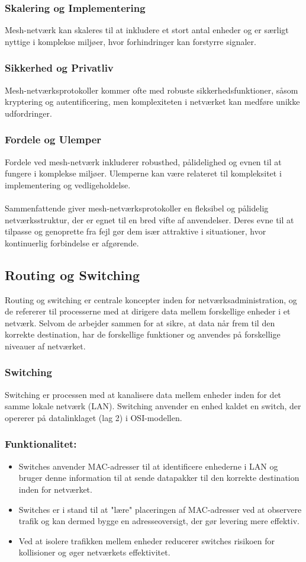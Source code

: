 \subsubsection{Skalering og Implementering}
Mesh-netværk kan skaleres til at inkludere et stort antal enheder og er særligt nyttige i komplekse miljøer, hvor forhindringer kan forstyrre signaler.
\subsubsection{Sikkerhed og Privatliv}
Mesh-netværksprotokoller kommer ofte med robuste sikkerhedsfunktioner, såsom kryptering og autentificering, men komplexiteten i netværket kan medføre unikke udfordringer.
\subsubsection{Fordele og Ulemper}
Fordele ved mesh-netværk inkluderer robusthed, pålidelighed og evnen til at fungere i komplekse miljøer. Ulemperne kan være relateret til kompleksitet i implementering og vedligeholdelse.
\\
\\
Sammenfattende giver mesh-netværksprotokoller en fleksibel og pålidelig \\
netværksstruktur, der er egnet til en bred vifte af anvendelser. Deres evne til at tilpasse og genoprette fra fejl gør dem især attraktive i situationer, hvor kontinuerlig forbindelse er afgørende.
\subsection{Routing og Switching}
Routing og switching er centrale koncepter inden for netværksadministration, og de refererer til processerne med at dirigere data mellem forskellige enheder i et netværk. Selvom de arbejder sammen for at sikre, at data når frem til den korrekte destination, har de forskellige funktioner og anvendes på forskellige niveauer af netværket.
\subsubsection{Switching}
Switching er processen med at kanalisere data mellem enheder inden for det samme lokale netværk (LAN). Switching anvender en enhed kaldet en switch, der opererer på datalinklaget (lag 2) i OSI-modellen.
\subsubsection{Funktionalitet:}
\begin{itemize}
	\item Switches anvender MAC-adresser til at identificere enhederne i LAN og bruger denne information til at sende datapakker til den korrekte destination inden for netværket.
	\item Switches er i stand til at "lære" placeringen af MAC-adresser ved at observere trafik
	og kan dermed bygge en adresseoversigt, der gør levering mere effektiv.
	\item Ved at isolere trafikken mellem enheder reducerer switches risikoen for kollisioner og øger netværkets effektivitet.
\end{itemize}

